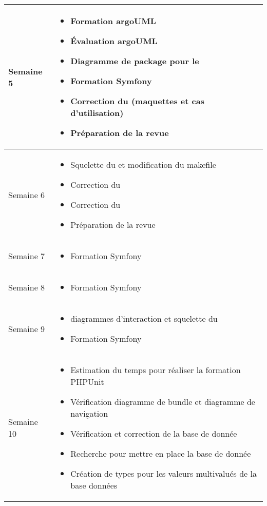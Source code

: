 \documentclass [a4paper] {article}
\begin{document}
\section*{\Melissa}

\begin{tabularx}{16.8cm}{|>{\columncolor{gray!40}}l|X|}
	\hline
	Semaine 5 & \begin{itemize}
		\item Formation argoUML
		\item Évaluation argoUML
		\item Diagramme de package pour le \DCPCourt
		\item Formation Symfony
		\item Correction du \DSICourt (maquettes et cas d'utilisation)
		\item Préparation de la revue
		\end{itemize} \\
	\hline
	
	Semaine 6 & \begin{itemize}
		\item Squelette du \DCPCourt{} et modification du makefile
		\item Correction du \DSECourt
		\item Correction du \DSICourt
		\item Préparation de la revue
		\end{itemize} \\
	\hline
	
	Semaine 7 & \begin{itemize}
		\item Formation Symfony
		\end{itemize} \\
	\hline
	
	Semaine 8 & \begin{itemize}
		\item Formation Symfony
		\end{itemize} \\
	\hline
	
	Semaine 9 & \begin{itemize}
		\item diagrammes d’interaction et squelette du \DCPCourt
		\item Formation Symfony
		\end{itemize} \\
	\hline
	
	Semaine 10 & \begin{itemize}
		\item Estimation du temps pour réaliser la formation PHPUnit
		\item Vérification diagramme de bundle et diagramme de navigation
		\item Vérification et correction de la base de donnée
		\item Recherche pour mettre en place la base de donnée 
		\item Création de types pour les valeurs multivalués de la base données
		\end{itemize} \\
	\hline
	
	
	
\end{tabularx}
\end{document}
